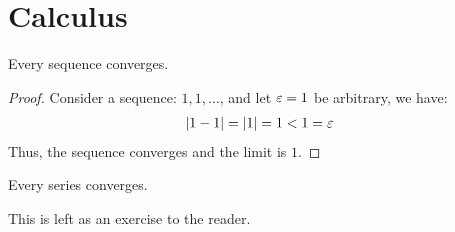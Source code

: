 \setcounter{section}{0}

\section{Calculus}

\begin{thm}
  Every sequence converges.
\end{thm}
\begin{proof}
  Consider a sequence: $1,1,\ldots$, and let $\varepsilon=1$ be arbitrary, 
  we have:
  \begin{align*}
    |1-1| = |1| = 1 < 1 = \varepsilon
  \end{align*}
  Thus, the sequence converges and the limit is $1$.
\end{proof}
\setcounter{lem}{0}
\begin{cor}
  Every series converges.
\end{cor}
This is left as an exercise to the reader.
